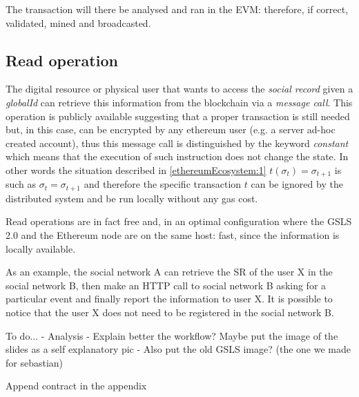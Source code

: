 The transaction will there be analysed and ran in the EVM: therefore, if correct, validated, mined and broadcasted.


\subsection{Read operation}

The digital resource or physical user that wants to access the \textit{social record} given a \textit{globalId} can retrieve this information from the blockchain via a \textit{message call}.
This operation is publicly available suggesting that a proper transaction is still needed but, in this case, can be encrypted by any ethereum user (e.g. a server ad-hoc created account), thus this message call is distinguished by the keyword \textit{constant} which means that the execution of such instruction does not change the state.
In other words the situation described in \ref{ethereumEcosystem:1} $t(\sigma_t) = \sigma_{t+1}$ is such as $\sigma_t = \sigma_{t+1}$ and therefore the specific transaction $t$ can be ignored by the distributed system and be run locally without any gas cost.

Read operations are in fact free and, in an optimal configuration where the GSLS 2.0 and the Ethereum node are on the same host: fast, since the information is locally available.

As an example, the social network A can retrieve the SR of the user X in the social network B, then make an HTTP call to social network B asking for a particular event and finally report the information to user X. It is possible to notice that the user X does not need to be registered in the social network B.

\begin{notation}
  To do... 
  - Analysis 
  - Explain better the workflow? Maybe put the image of the slides as a self explanatory pic
  - Also put the old GSLS image? (the one we made for sebastian)
\end{notation}


\begin{notation}
  Append contract in the appendix
\end{notation}